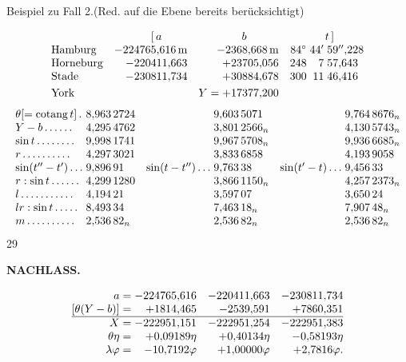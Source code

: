 \medskip
{\centering Beispiel zu Fall 2.\quad (Red. auf die Ebene bereits berücksichtigt)\par}
\[
\begin{array}{@{}l@{\quad}r@{\quad}r@{\quad}r@{\;}r@{\;}l@{}}
 &\multicolumn{1}{c}{[\,a}&\multicolumn{1}{c}{b}
 &\multicolumn{3}{c@{}}{t\,]}\\
 \text{Hamburg}&-224765{,}616\,\mathrm{m}&-2368{,}668\,\mathrm{m}&84^\circ&44'&59''{,}228\\
 \text{Horneburg}&-220411{,}663&+23705{,}056&248&7&57{,}643\\
 \text{Stade}&-230811{,}734&+30884{,}678&300&11&46{,}416\\[3pt]
 \text{York}&&Y=+17377{,}200&&&
\end{array}
\]
\[
\resizebox{\linewidth}{!}{\(\begin{array}{@{}l@{\;}l@{\quad}r@{\;}l@{\quad}r@{\;}l@{}}
 \theta[=\operatorname{cotang}t]\,.&8{,}963\,2724&&9{,}603\,5071&&9{,}764\,8676_{n}\\
 Y-b\,.\,.\,.\,.\,.\,.&4{,}295\,4762&&3{,}801\,2566_{n}&&4{,}130\,5743_{n}\\
 \sin t\,.\,.\,.\,.\,.\,.\,.\,.&9{,}998\,1741&&9{,}967\,5708_{n}&&9{,}936\,6685_{n}\\
 r\,.\,.\,.\,.\,.\,.\,.\,.\,.\,.&4{,}297\,3021&&3{,}833\,6858&&4{,}193\,9058\\
 \sin(t''-t')\,.\,.\,.&9{,}896\,91&\sin(t-t'')\,.\,.\,.&9{,}763\,38&\sin(t'-t)\,.\,.\,.&9{,}456\,33\\
 r:\sin t\,.\,.\,.\,.\,.\,.&4{,}299\,1280&&3{,}866\,1150_{n}&&4{,}257\,2373_{n}\\
 l\,.\,.\,.\,.\,.\,.\,.\,.\,.\,.\,.&4{,}194\,21&&3{,}597\,07&&3{,}650\,24\\
 lr:\sin t\,.\,.\,.\,.\,.&8{,}493\,34&&7{,}463\,18_{n}&&7{,}907\,48_{n}\\
 m\,.\,.\,.\,.\,.\,.\,.\,.\,.\,.&2{,}536\,82_{n}&&2{,}536\,82_{n}&&2{,}536\,82_{n}
\end{array}\)}
\]
\hfill{\small 29}\hspace*{.12\linewidth}\par

\par\clearpage
\noindent{}\hfill{\small\textbf{NACHLASS.}}\hfill\null\par\medskip

\[
\begin{array}{@{}r@{\;}r@{\quad}r@{\quad}r@{}}
 a=&-224765{,}616&-220411{,}663&-230811{,}734\\
 {[}\theta(Y-b)]=&+1814{,}465&-2539{,}591&+7860{,}351\\
 \hline
 X=&-222951{,}151&-222951{,}254&-222951{,}383\\
 \theta\eta=&+0{,}09189\eta&+0{,}40134\eta&-0{,}58193\eta\\
 \lambda\varphi=&-10{,}7192\varphi&+1{,}00000\varphi&+2{,}7816\varphi.
\end{array}
\]

